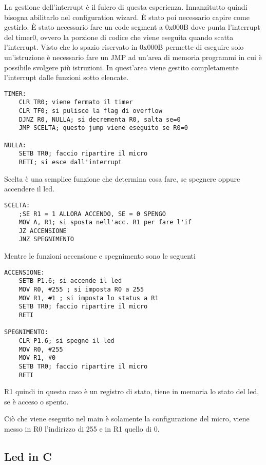 \documentclass[main.tex]{subfiles}
\begin{document}
La gestione dell'interrupt è il fulcro di questa esperienza. Innanzitutto quindi bisogna abilitarlo nel configuration wizard. È stato poi necessario capire come gestirlo. È stato necessario fare un code segment a 0x000B dove punta l'interrupt del timer0, ovvero la porzione di codice che viene eseguita quando scatta l'interrupt. Visto che lo spazio riservato in 0x000B permette di eseguire solo un'istruzione è necessario fare un JMP ad un'area di memoria programmi in cui è possibile svolgere più istruzioni. In quest'area viene gestito completamente l'interrupt dalle funzioni sotto elencate.

\begin{lstlisting}[caption=Funzione timer]
TIMER:
    CLR TR0; viene fermato il timer
    CLR TF0; si pulisce la flag di overflow
    DJNZ R0, NULLA; si decrementa R0, salta se=0
    JMP SCELTA; questo jump viene eseguito se R0=0

NULLA:
    SETB TR0; faccio ripartire il micro
    RETI; si esce dall'interrupt
\end{lstlisting}
 
 Scelta è una semplice funzione che determina cosa fare, se spegnere oppure accendere il led.
 \begin{lstlisting}[caption=Funzione scelta]
 SCELTA:
	;SE R1 = 1 ALLORA ACCENDO, SE = 0 SPENGO
	MOV A, R1; si sposta nell'acc. R1 per fare l'if
	JZ ACCENSIONE
	JNZ SPEGNIMENTO
 \end{lstlisting}

Mentre le funzioni accensione e spegnimento sono le seguenti
\begin{lstlisting}[caption=Funzioni accensione e spegnimento]
ACCENSIONE:
	SETB P1.6; si accende il led
	MOV R0, #255 ; si imposta R0 a 255
	MOV R1, #1 ; si imposta lo status a R1
	SETB TR0; faccio ripartire il micro
	RETI

SPEGNIMENTO:
	CLR P1.6; si spegne il led
	MOV R0, #255
	MOV R1, #0
	SETB TR0; faccio ripartire il micro
	RETI
\end{lstlisting}
R1 quindi in questo caso è un registro di stato, tiene in memoria lo stato del led, se è acceso o spento.

Ciò che viene eseguito nel main è solamente la configurazione del micro, viene messo in R0 l'indirizzo di 255 e in R1 quello di 0.

\subsection{Led in C}
\end{document}
